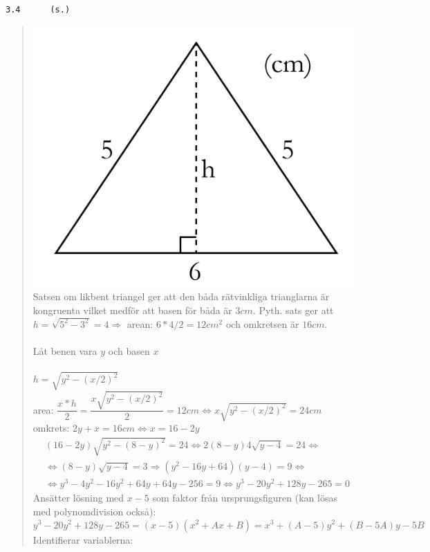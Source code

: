 \documentclass[a4paper]{article}
\newcommand{\tskcol}[1]{\textcolor{tskcol}{#1}}
\begin{document}
	\pagebreak	
	\texttt{\tskcol{3.4~~~~~ (s.)}}
	\begin{quotation}
		\noindent
		\includegraphics[scale=0.3]{images/34.png} \\
		Satsen om likbent triangel ger att den båda rätvinkliga trianglarna är kongruenta vilket medför att basen för båda är $3cm$.
		Pyth. sats ger att $h=\sqrt{5^2-3^2}=4 \Rightarrow$ arean: $6*4/2=12cm^2$ och omkretsen är $16cm$. \\ \\
		Låt benen vara $y$ och basen $x$ \\ \\
		$h=\sqrt{y^2-(x/2)^2}$ \\
		area: $\dfrac{x*h}{2}=\dfrac{x\sqrt{y^2-(x/2)^2}}{2}=12cm \Leftrightarrow x\sqrt{y^2-(x/2)^2}=24cm$ \\
		omkrets: $2y+x=16cm \Leftrightarrow x=16-2y$
		\begin{align*}
		&(16-2y)\sqrt{y^2-(8-y)^2}=24 \Leftrightarrow
		2(8-y)4\sqrt{y-4}=24 \Leftrightarrow \\
		&\Leftrightarrow (8-y)\sqrt{y-4}=3 \Rightarrow
		(y^2-16y+64)(y-4)=9 \Leftrightarrow \\
		&\Leftrightarrow y^3-4y^2-16y^2+64y+64y-256=9 \Leftrightarrow
		y^3-20y^2+128y-265=0
		\end{align*}
		Ansätter lösning med $x-5$ som faktor från ursprungsfiguren (kan lösas med polynomdivision också): \\
		\[y^3-20y^2+128y-265=(x-5)(x^2+Ax+B)=x^3+(A-5)y^2+(B-5A)y-5B\]
		Identifierar variablerna: \\

\end{quotation}
\end{document}
